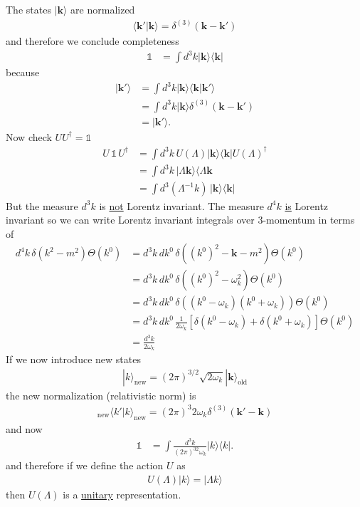 \documentclass{article}
\begin{document}
The states $|\mathbf{k}\rangle$ are normalized
\begin{align}
\langle\mathbf{k}'|\mathbf{k}\rangle=\delta^{(3)}(\mathbf{k}-\mathbf{k}')
\end{align}
and therefore we conclude completeness
\begin{align}
\mathbb{1}&=\int d^3k|\mathbf{k}\rangle\langle\mathbf{k}|
\end{align}
because
\begin{align}
|\mathbf{k}'\rangle
&=\int d^3k|\mathbf{k}\rangle\langle\mathbf{k}|\mathbf{k}'\rangle\\
&=\int d^3k|\mathbf{k}\rangle\delta^{(3)}(\mathbf{k}-\mathbf{k}')\\
&=|\mathbf{k}'\rangle.
\end{align}
Now check $UU^\dagger=\mathbb{1}$
\begin{align}
U\,\mathbb{1}\,U^\dagger
&=\int d^3k\,U(\Lambda)|\mathbf{k}\rangle\langle \mathbf{k}|U(\Lambda)^\dagger\\
&=\int d^3k\,|\Lambda\mathbf{k}\rangle\langle \Lambda\mathbf{k}\\
&=\int d^3(\Lambda^{-1}k)\,|\mathbf{k}\rangle\langle \mathbf{k}|
\end{align}
But the measure $d^3k$ is \underline{not} Lorentz invariant. The measure $d^4k$ \underline{is} Lorentz invariant so we can write Lorentz invariant integrals over 3-momentum in terms of
\begin{align}
d^4k\,\delta(k^2-m^2)\Theta(k^0)
&=d^3k\,dk^0\,\delta\left((k^0)^2-\mathbf{k}-m^2\right)\Theta(k^0)\\
&=d^3k\,dk^0\,\delta\left((k^0)^2-\omega_k^2\right)\Theta(k^0)\\
&=d^3k\,dk^0\,\delta\left((k^0-\omega_k)(k^0+\omega_k)\right)\Theta(k^0)\\
&=d^3k\,dk^0\,\frac{1}{2\omega_k}\left[\delta(k^0-\omega_k)+\delta(k^0+\omega_k)\right]\Theta(k^0)\\
&=\frac{d^3k}{2\omega_k}
\end{align}
If we now introduce new states
\begin{align}
|k\rangle_\text{new}=(2\pi)^{3/2}\sqrt{2\omega_k}|\mathbf{k}\rangle_\text{old}
\end{align}
the new normalization (relativistic norm) is
\begin{align}
{}_\text{new}\langle k'|k\rangle_\text{new}
=(2\pi)^3 2\omega_k\delta^{(3)}(\mathbf{k}'-\mathbf{k})
\end{align}
and now
\begin{align}
\mathbb{1}&=\int \frac{d^3k}{(2\pi)^32\omega_k}|k\rangle\langle k|.
\end{align}
and therefore if we define the action $U$ as 
\begin{align}
U(\Lambda)|k\rangle=|\Lambda k \rangle
\end{align}
then $U(\Lambda)$ is a \underline{unitary} representation.
\end{document}
